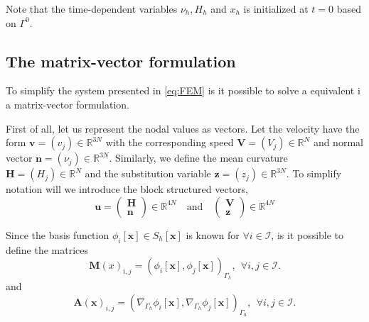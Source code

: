 Note that the time-dependent variables $\nu_{h}, H_{h} $ and $x_{h}$ is initialized at $t=0$  based on $\Gamma ^{0}$.







\subsection{The matrix-vector formulation}%
\label{sub:the_matrix_formulation}

To simplify the system presented in \eqref{eq:FEM} is it possible to solve a equivalent i a matrix-vector formulation.

First of all, let us represent the nodal values as vectors. Let the velocity have the form $\mathbf{v} = \left( v_{j} \right) \in \mathbb{R} ^{3N}$ with the
corresponding speed $\mathbf{V} =
\left( V_{j} \right) \in \mathbb{R} ^{N} $ and normal vector $\mathbf{n} = \left( \nu _{j} \right) \in  \mathbb{R} ^{3N}$. Similarly, we define the mean curvature $\mathbf{H}  = ( H_{j})  \in  \mathbb{R} ^{N}  $ and the substitution variable
$\mathbf{z} = \left( z_{j} \right) \in \mathbb{R} ^{3N}$. To simplify notation will we introduce the block structured vectors,\[
\mathbf{u} = \begin{pmatrix}
\mathbf{H} \\
\mathbf{n}
\end{pmatrix}
\in \mathbb{R} ^{4N}
\quad \text{and} \quad \begin{pmatrix}
\mathbf{V} \\
\mathbf{z}
\end{pmatrix}
\in \mathbb{R} ^{4N}
\]

Since the basis function $\phi_{i} \left[ \mathbf{x} \right] \in S_{h}\left[ \mathbf{x} \right]  $ is known for $\forall i \in \mathcal{I}  $, is it possible to define the matrices \[
\mathbf{M}\left( x \right)_{i,j} =  \left( \phi _{i}\left[ \mathbf{x} \right], \phi_{j} \left[ \mathbf{x} \right] \right) _{ \Gamma _{h}},  \ \  \forall i,j \in \mathcal{I}.
\]
and \[
\mathbf{A}\left( \mathbf{x} \right)_{i,j} = \left( \nabla _{\Gamma _{h}} \phi _{i} \left[ \mathbf{x} \right], \nabla _{\Gamma _{h}}\phi _{j} \left[ \mathbf{x} \right]  \right)_{\Gamma _{h}}, \ \   \forall i,j \in \mathcal{I}.
\]

